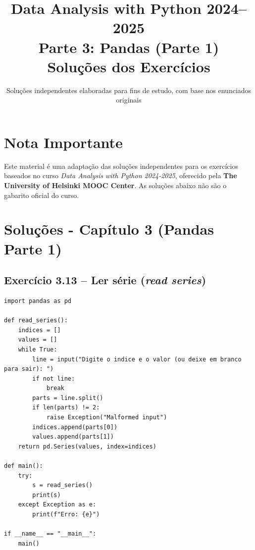 \documentclass[11pt,a4paper]{article}
\title{\textbf{Data Analysis with Python 2024--2025}\\Parte 3: Pandas (Parte 1)\\\large Soluções dos Exercícios}
\author{Soluções independentes elaboradas para fins de estudo, com base nos enunciados originais}
\date{}
\begin{document}
\maketitle

\section*{Nota Importante}
Este material é uma adaptação das soluções independentes para os exercícios baseados no curso \textit{Data Analysis with Python 2024-2025}, oferecido pela \textbf{The University of Helsinki MOOC Center}. As soluções abaixo não são o gabarito oficial do curso.

\tableofcontents
\newpage

\section{Soluções - Capítulo 3 (Pandas Parte 1)}

\subsection*{Exercício 3.13 -- Ler série (\textit{read series})}
\begin{solucao}
\begin{lstlisting}
import pandas as pd

def read_series():
    indices = []
    values = []
    while True:
        line = input("Digite o indice e o valor (ou deixe em branco para sair): ")
        if not line:
            break
        parts = line.split()
        if len(parts) != 2:
            raise Exception("Malformed input")
        indices.append(parts[0])
        values.append(parts[1])
    return pd.Series(values, index=indices)

def main():
    try:
        s = read_series()
        print(s)
    except Exception as e:
        print(f"Erro: {e}")

if __name__ == "__main__":
    main()
\end{lstlisting}
\end{solucao}
\end{document}
